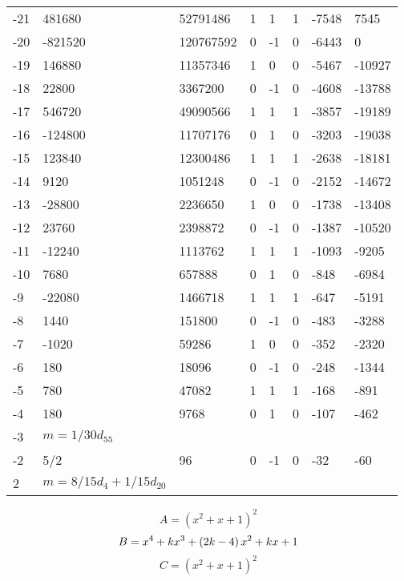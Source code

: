 \documentclass{amsart}
\begin{document}
\begin{longtable}{|l|l|l|lllll|}
-21&481680&52791486&1&1&1&-7548&7545\\
-20&-821520&120767592&0&-1&0&-6443&0\\
-19&146880&11357346&1&0&0&-5467&-10927\\
-18&22800&3367200&0&-1&0&-4608&-13788\\
-17&546720&49090566&1&1&1&-3857&-19189\\
-16&-124800&11707176&0&1&0&-3203&-19038\\
-15&123840&12300486&1&1&1&-2638&-18181\\
-14&9120&1051248&0&-1&0&-2152&-14672\\
-13&-28800&2236650&1&0&0&-1738&-13408\\
-12&23760&2398872&0&-1&0&-1387&-10520\\
-11&-12240&1113762&1&1&1&-1093&-9205\\
-10&7680&657888&0&1&0&-848&-6984\\
-9&-22080&1466718&1&1&1&-647&-5191\\
-8&1440&151800&0&-1&0&-483&-3288\\
-7&-1020&59286&1&0&0&-352&-2320\\
-6&180&18096&0&-1&0&-248&-1344\\
-5&780&47082&1&1&1&-168&-891\\
-4&180&9768&0&1&0&-107&-462\\
-3&$m=1/30d_{55}$&&\multicolumn{5}{c|}{}\\
-2&5/2&96&0&-1&0&-32&-60\\
2&$m=8/15d_{4}+1/15d_{20}$&&\multicolumn{5}{c|}{}\\
\hline
\end{longtable}
$$A=(x^2
 + x
 + 1)^{2}$$
$$B=x^4
 + k\*x^3
 + \left(2\*k
 - 4\right) \*x^2
 + k\*x
 + 1$$
$$C=(x^2
 + x
 + 1)^{2}$$
\end{document}

